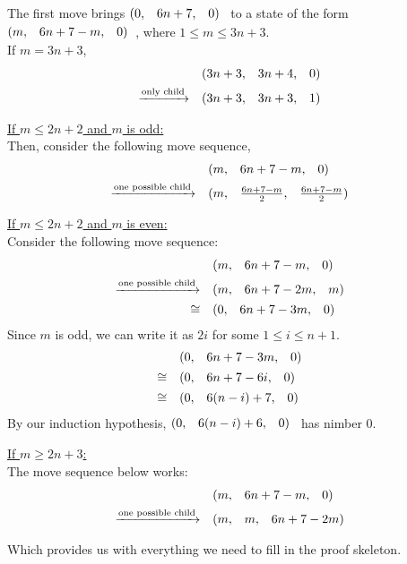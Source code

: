 \documentclass{article}
\makeatletter
\newcommand{\game}[3]{\begin{array}{@{}*6r}(#1, & #2, & #3)\end{array}}
\makeatother
\begin{document}
\medskip
The first move brings $\game{0}{6n+7}{0}$ to a state of the form
$\game{m}{6n+7-m}{0}$, where $1 \leq m \leq 3n+3$. \\
If $m = 3n + 3$,
\begin{align*}
  & \game{3n+3}{3n+4}{0} \\
  \xrightarrow{\text{only child}} \quad & 
  \game{3n+3}{3n+3}{1}
\end{align*}

\bigskip
\underline{If $m \leq 2n + 2$ and $m$ is odd:} \\
Then, consider the following move sequence,
\begin{align*}
  & \game{m}{6n+7-m}{0} \\
  \xrightarrow{\text{one possible child}} \quad & 
  \game{m}{\frac{6n+7-m}{2}}{\frac{6n+7-m}{2}}
\end{align*}

\bigskip
\underline{If $m \leq 2n + 2$ and $m$ is even:} \\
Consider the following move sequence:
\begin{align*}
  & \game{m}{6n+7-m}{0} \\
  \xrightarrow{\text{one possible child}} \quad & 
  \game{m}{6n+7-2m}{m} \\
  \cong \quad & 
  \game{0}{6n+7-3m}{0} \\
\end{align*}
Since $m$ is odd, we can write it as $2i$ for some $1\leq i\leq n+1$.
\begin{align*}
  & \game{0}{6n+7-3m}{0} \\
  \cong \quad & \game{0}{6n+7-6i}{0} \\
  \cong \quad & \game{0}{6(n-i)+7}{0} \\
\end{align*}
By our induction hypothesis, $\game{0}{6(n-i)+6}{0}$ has nimber $0$.

\bigskip
\underline{If $m \geq 2n + 3$:} \\
The move sequence below works:
\begin{align*}
  & \game{m}{6n+7-m}{0} \\
  \xrightarrow{\text{one possible child}} \quad & 
  \game{m}{m}{6n+7-2m}
\end{align*}

\bigskip
Which provides us with everything we need to fill in the proof
skeleton.
\end{document}
